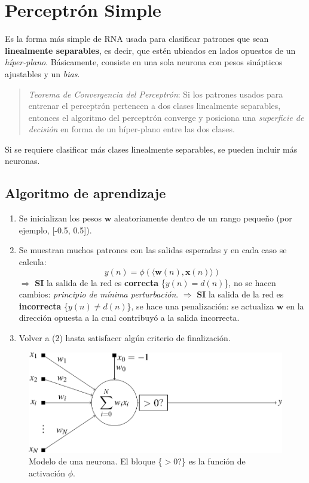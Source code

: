 \documentclass[10pt,a4paper]{article}
\begin{document}

\section{Perceptrón Simple}

Es la forma más simple de RNA usada para clasificar patrones que sean \textbf{linealmente separables}, es decir, que estén ubicados en lados opuestos de un \textit{híper-plano}. Básicamente, consiste en una sola neurona con pesos sinápticos ajustables y un \textit{bias}.

\begin{quote}
\textit{Teorema de Convergencia del Perceptrón}: Si los patrones usados para entrenar el perceptrón pertencen a dos clases linealmente separables, entonces el algoritmo del perceptrón converge y posiciona una \textit{superficie de decisión} en forma de un híper-plano entre las dos clases.
\end{quote}

Si se requiere clasificar más clases linealmente separables, se pueden incluir más neuronas.

\subsection{Algoritmo de aprendizaje}

\begin{enumerate}
\item Se inicializan los pesos $\mathbf{w}$ aleatoriamente dentro de un rango pequeño (por ejemplo, [-0.5, 0.5]).
\item Se muestran muchos patrones con las salidas esperadas y en cada caso se calcula:
\[y(n) = \phi(\langle\mathbf{w}(n), \mathbf{x}(n)\rangle)\]
\subitem $\Rightarrow$ \textbf{SI} la salida de la red es \textbf{correcta} \{$y(n)= d(n)$\}, no se hacen cambios: \textit{principio de mínima perturbación}.
\subitem $\Rightarrow$ \textbf{SI} la salida de la red es \textbf{incorrecta} \{$y(n) \neq d(n)$\}, se hace una penalización: se actualiza $\mathbf{w}$ en la dirección opuesta a la cual contribuyó a la salida incorrecta.
\item Volver a (2) hasta satisfacer algún criterio de finalización.
\end{enumerate}

\begin{figure}[ht!]
  \caption{Modelo de una neurona. El bloque \{$>0$?\} es la función de activación $\phi$.}
  \label{fig:perceptron_simple}
  \centerline{\includegraphics[width=0.6\textwidth-\fboxrule-\fboxrule]{imgs/perceptron_simple.png}}
\end{figure}
\end{document}
